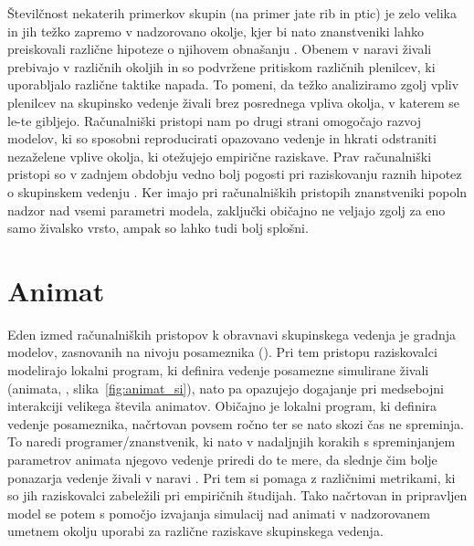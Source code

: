\begin{razsirjeniPovzetek}
Številčnost nekaterih primerkov skupin (na primer jate rib in ptic) je zelo velika in jih težko zapremo v nadzorovano okolje, kjer bi nato znanstveniki lahko preiskovali različne hipoteze o njihovem obnašanju \cite{lebarbajec2009organized}. Obenem v naravi živali prebivajo v različnih okoljih in so podvržene pritiskom različnih plenilcev, ki uporabljalo različne taktike napada. To pomeni, da težko analiziramo zgolj vpliv plenilcev na skupinsko vedenje živali brez posrednega vpliva okolja, v katerem se le-te gibljejo. Računalniški pristopi nam po drugi strani omogočajo razvoj modelov, ki so sposobni reproducirati opazovano vedenje in hkrati odstraniti nezaželene vplive okolja, ki otežujejo empirične raziskave. Prav računalniški pristopi so v zadnjem obdobju vedno bolj pogosti pri raziskovanju raznih hipotez o skupinskem vedenju \cite{vicsek1995novel,couzin2002collective,hildenbrandt2010selforganized}. Ker imajo pri računalniških pristopih znanstveniki popoln nadzor nad vsemi parametri modela, zaključki običajno ne veljajo zgolj za eno samo živalsko vrsto, ampak so lahko tudi bolj splošni.

\section{Animat}

Eden izmed računalniških pristopov k obravnavi skupinskega vedenja je gradnja modelov, zasnovanih na nivoju posameznika (). Pri tem pristopu raziskovalci modelirajo lokalni program, ki definira vedenje posamezne simulirane živali (animata,  \cite{cliff1993adding,fine2013unifying,lebarbajec2005fuzzy,watts1998animats,wilson1985knowledge}, slika~\ref{fig:animat_si}), nato pa opazujejo dogajanje pri medsebojni interakciji velikega števila animatov. Običajno je lokalni program, ki definira vedenje posameznika, načrtovan povsem ročno ter se nato skozi čas ne spreminja. To naredi programer/znanstvenik, ki nato v nadaljnjih korakih s spreminjanjem parametrov animata njegovo vedenje priredi do te mere, da slednje čim bolje ponazarja vedenje živali v naravi \cite{couzin2002collective,demsar2014simulated,demsar2015simulating,lebarbajec2005fuzzy,lebarbajec2005simulating,hildenbrandt2010selforganized,vicsek1995novel}. Pri tem si pomaga z različnimi metrikami, ki so jih raziskovalci zabeležili pri empiričnih študijah. Tako načrtovan in pripravljen model se potem s pomočjo izvajanja simulacij nad animati v nadzorovanem umetnem okolju uporabi za različne raziskave skupinskega vedenja. 


\end{razsirjeniPovzetek}
